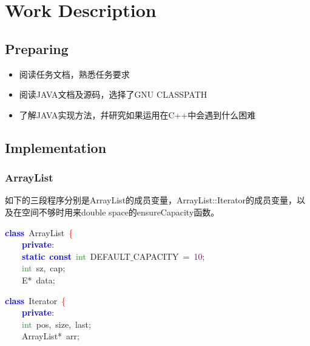 \chapter{Work Description}
\section{Preparing}
\begin{itemize}
    \item 阅读任务文档，熟悉任务要求
    \item 阅读JAVA文档及源码，选择了GNU CLASSPATH
    \item 了解JAVA实现方法，幷研究如果运用在C++中会遇到什么困难
\end{itemize}

\section{Implementation}

\subsection{ArrayList}
如下的三段程序分别是ArrayList的成员变量，ArrayList::Iterator的成员变量，以及在空间不够时用来double space的ensureCapacity函数。


\begin{center}\begin{minipage}{120mm}
\noindent
\mbox{}\textbf{\textcolor{Blue}{class}}\ \textcolor{TealBlue}{ArrayList}\ \textcolor{Red}{\{} \\
\mbox{}\ \ \ \ \textbf{\textcolor{Blue}{private}}\textcolor{BrickRed}{:} \\
\mbox{}\ \ \ \ \textbf{\textcolor{Blue}{static}}\ \textbf{\textcolor{Blue}{const}}\ \textcolor{ForestGreen}{int}\ DEFAULT$\_$CAPACITY\ \textcolor{BrickRed}{=}\ \textcolor{Purple}{10}\textcolor{BrickRed}{;} \\
\mbox{}\ \ \ \ \textcolor{ForestGreen}{int}\ sz\textcolor{BrickRed}{,}\ cap\textcolor{BrickRed}{;} \\
\mbox{}\ \ \ \ E\textcolor{BrickRed}{*}\ data\textcolor{BrickRed}{;} 
\end{minipage}\end{center}

\begin{center}\begin{minipage}{120mm}
\noindent
\mbox{}\textbf{\textcolor{Blue}{class}}\ \textcolor{TealBlue}{Iterator}\ \textcolor{Red}{\{} \\
\mbox{}\ \ \ \ \textbf{\textcolor{Blue}{private}}\textcolor{BrickRed}{:} \\
\mbox{}\ \ \ \ \textcolor{ForestGreen}{int}\ pos\textcolor{BrickRed}{,}\ size\textcolor{BrickRed}{,}\ last\textcolor{BrickRed}{;} \\
\mbox{}\ \ \ \ ArrayList\textcolor{BrickRed}{*}\ arr\textcolor{BrickRed}{;}
\end{minipage}\end{center}

